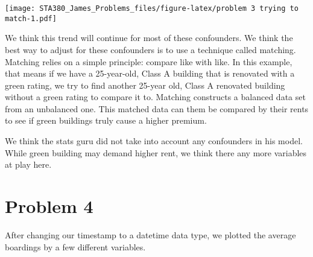 \documentclass[
]{article}
\newenvironment{Shaded}{\begin{snugshade}}{\end{snugshade}}
\newcommand{\AttributeTok}[1]{\textcolor[rgb]{0.13,0.29,0.53}{#1}}
\newcommand{\CommentTok}[1]{\textcolor[rgb]{0.56,0.35,0.01}{\textit{#1}}}
\newcommand{\FunctionTok}[1]{\textcolor[rgb]{0.13,0.29,0.53}{\textbf{#1}}}
\newcommand{\NormalTok}[1]{#1}
\newcommand{\OtherTok}[1]{\textcolor[rgb]{0.56,0.35,0.01}{#1}}
\newcommand{\SpecialCharTok}[1]{\textcolor[rgb]{0.81,0.36,0.00}{\textbf{#1}}}
\newcommand{\StringTok}[1]{\textcolor[rgb]{0.31,0.60,0.02}{#1}}
\begin{document}
\texttt{[image: STA380\_James\_Problems\_files/figure-latex/problem 3 trying to match-1.pdf]}

We think this trend will continue for most of these confounders. We
think the best way to adjust for these confounders is to use a technique
called matching. Matching relies on a simple principle: compare like
with like. In this example, that means if we have a 25-year-old, Class A
building that is renovated with a green rating, we try to find another
25-year old, Class A renovated building without a green rating to
compare it to. Matching constructs a balanced data set from an
unbalanced one. This matched data can them be compared by their rents to
see if green buildings truly cause a higher premium.

We think the stats guru did not take into account any confounders in his
model. While green building may demand higher rent, we think there any
more variables at play here.

\section{Problem 4}\label{problem-4}

After changing our timestamp to a datetime data type, we plotted the
average boardings by a few different variables.

\begin{Shaded}
\end{Shaded}
\end{document}

